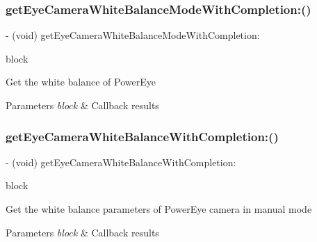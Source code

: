 \subsubsection{\texorpdfstring{get\+Eye\+Camera\+White\+Balance\+Mode\+With\+Completion\+:()}{getEyeCameraWhiteBalanceModeWithCompletion:()}}
{\footnotesize\ttfamily -\/ (void) get\+Eye\+Camera\+White\+Balance\+Mode\+With\+Completion\+: \begin{DoxyParamCaption}\item[{(void($^\wedge$)(P\+V\+Eye\+Camera\+White\+Balance\+Mode white\+Balance\+Mode, N\+S\+Error $\ast$\+\_\+\+Nullable error))}]{block }\end{DoxyParamCaption}}

Get the white balance of Power\+Eye


\begin{DoxyParams}{Parameters}
{\em block} & Callback results \\
\hline
\end{DoxyParams}
\mbox{\label{interface_p_v_eye_camera_a0be0498fe55127e830a89d2e9b844c9d}} 
\subsubsection{\texorpdfstring{get\+Eye\+Camera\+White\+Balance\+With\+Completion\+:()}{getEyeCameraWhiteBalanceWithCompletion:()}}
{\footnotesize\ttfamily -\/ (void) get\+Eye\+Camera\+White\+Balance\+With\+Completion\+: \begin{DoxyParamCaption}\item[{(void($^\wedge$)(N\+S\+Integer white\+Balance, N\+S\+Error $\ast$\+\_\+\+Nullable error))}]{block }\end{DoxyParamCaption}}

Get the white balance parameters of Power\+Eye camera in manual mode


\begin{DoxyParams}{Parameters}
{\em block} & Callback results \\
\hline
\end{DoxyParams}
\mbox{\label{interface_p_v_eye_camera_a6e9ae0dd101cddb8cca78c88bac7149b}} 
